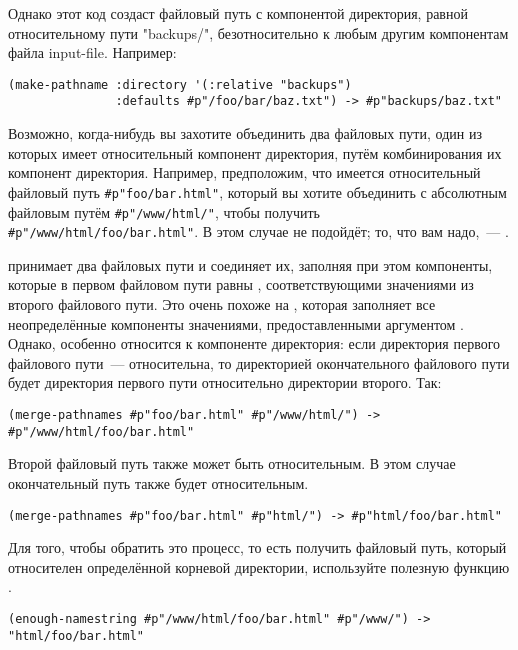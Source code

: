 Однако этот код создаст файловый путь с компонентой директория, равной относительному пути
"backups/", безотносительно к любым другим компонентам файла input-file. Например:

\begin{lstlisting}
(make-pathname :directory '(:relative "backups") 
               :defaults #p"/foo/bar/baz.txt") -> #p"backups/baz.txt" 
\end{lstlisting}

Возможно, когда-нибудь вы захотите объединить два файловых пути, один из которых имеет
относительный компонент директория, путём комбинирования их компонент
директория. Например, предположим, что имеется относительный файловый путь
\lstinline!#p"foo/bar.html"!, который вы хотите объединить с абсолютным файловым путём
\lstinline!#p"/www/html/"!, чтобы получить \lstinline!#p"/www/html/foo/bar.html"!. В этом
случае  не подойдёт; то, что вам надо,~--- .

 принимает два файловых пути и соединяет их, заполняя при этом
компоненты, которые в первом файловом пути равны , соответствующими значениями
из второго файлового пути. Это очень похоже на , которая заполняет все
неопределённые компоненты значениями, предоставленными аргументом
. Однако,  особенно относится к компоненте
директория: если директория первого файлового пути~--- относительна, то директорией
окончательного файлового пути будет директория первого пути относительно директории
второго. Так:

\begin{lstlisting}
(merge-pathnames #p"foo/bar.html" #p"/www/html/") -> #p"/www/html/foo/bar.html" 
\end{lstlisting}

Второй файловый путь также может быть относительным. В этом случае окончательный путь
также будет относительным.

\begin{lstlisting}
(merge-pathnames #p"foo/bar.html" #p"html/") -> #p"html/foo/bar.html" 
\end{lstlisting}

Для того, чтобы обратить это процесс, то есть получить файловый путь, который относителен
определённой корневой директории, используйте полезную функцию .

\begin{lstlisting}
(enough-namestring #p"/www/html/foo/bar.html" #p"/www/") -> "html/foo/bar.html" 
\end{lstlisting}

